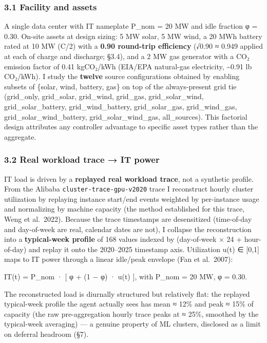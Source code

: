 \documentclass[
  11pt,
]{article}
\begin{document}
\subsubsection{3.1 Facility and assets}\label{facility-and-assets}

A single data center with IT nameplate P\_nom = 20 MW and idle fraction
φ = 0.30. On-site assets at design sizing: 5 MW solar, 5 MW wind, a 20
MWh battery rated at 10 MW (C/2) with a \textbf{0.90 round-trip
efficiency} (√0.90 ≈ 0.949 applied at each of charge and discharge;
§3.4), and a 2 MW gas generator with a CO₂ emission factor of 0.41
kgCO₂/kWh (EIA/EPA natural-gas electricity, \textasciitilde0.91 lb
CO₂/kWh). I study the \textbf{twelve} source configurations obtained by
enabling subsets of \{solar, wind, battery, gas\} on top of the
always-present grid tie (grid\_only, grid\_solar, grid\_wind, grid\_gas,
grid\_solar\_wind, grid\_solar\_battery, grid\_wind\_battery,
grid\_solar\_gas, grid\_wind\_gas, grid\_solar\_wind\_battery,
grid\_solar\_wind\_gas, all\_sources). This factorial design attributes
any controller advantage to specific asset types rather than the
aggregate.

\subsubsection{3.2 Real workload trace → IT
power}\label{real-workload-trace-it-power}

IT load is driven by a \textbf{replayed real workload trace}, not a
synthetic profile. From the Alibaba \texttt{cluster-trace-gpu-v2020}
trace I reconstruct hourly cluster utilization by replaying instance
start/end events weighted by per-instance usage and normalizing by
machine capacity (the method established for this trace, Weng et
al.~2022). Because the trace timestamps are desensitized (time-of-day
and day-of-week are real, calendar dates are not), I collapse the
reconstruction into a \textbf{typical-week profile} of 168 values
indexed by (day-of-week × 24 + hour-of-day) and replay it onto the
2020--2025 timestamp axis. Utilization u(t) ∈ {[}0,1{]} maps to IT power
through a linear idle/peak envelope (Fan et al.~2007):

IT(t) = P\_nom · {[} φ + (1 − φ) · u(t) {]}, with P\_nom = 20 MW, φ =
0.30.

The reconstructed load is diurnally structured but relatively flat: the
replayed typical-week profile the agent actually sees has mean ≈ 12\%
and peak ≈ 15\% of capacity (the raw pre-aggregation hourly trace peaks
at ≈ 25\%, smoothed by the typical-week averaging) --- a genuine
property of ML clusters, disclosed as a limit on deferral headroom (§7).
\end{document}
